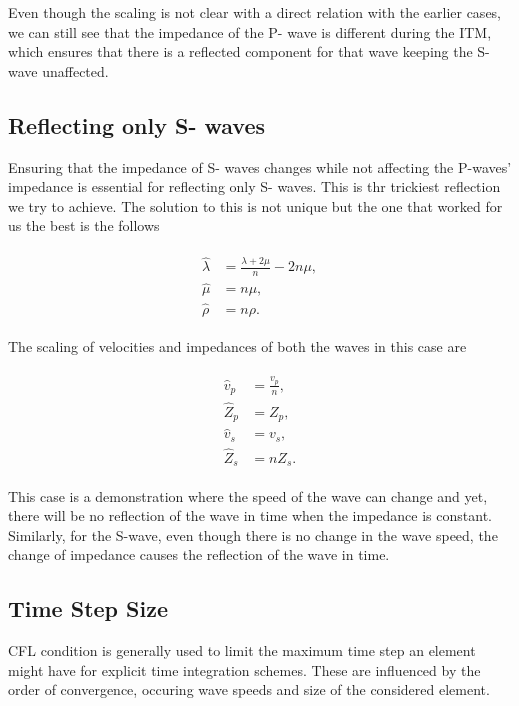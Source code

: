 Even though the scaling is not clear with a direct relation with the earlier cases, we can still see that the impedance of the P- wave is different during the \ac{ITM}, 
which ensures that there is a reflected component for that wave keeping the S-wave unaffected. \\

\subsection{Reflecting only S- waves}

Ensuring that the impedance of S- waves changes while not affecting the P-waves' impedance is essential for reflecting only S- waves. This is thr trickiest
reflection we try to achieve. The solution to this is not unique but the one that worked for us the best is the follows

\begin{align}
    \begin{split}
        \hat{\lambda} &= \frac{\lambda + 2 \mu}{n} -  2n \mu ,\\
        \hat{\mu} &= n \mu ,\\
        \hat{\rho} &= n \rho .
    \end{split}
\end{align}

The scaling of velocities and impedances of both the waves in this case are 

\begin{align}
    \begin{split}
        \hat{v}_p &= \frac{v_p}{n} ,\\
        \hat{Z}_p &= Z_p ,\\
        \hat{v}_s &= v_s ,\\
        \hat{Z}_s &= n Z_s .
    \end{split}
\end{align}

This case is a demonstration where the speed of the wave can change and yet, there will be no reflection of the wave in time when the impedance is constant.
Similarly, for the S-wave, even though there is no change in the wave speed, the change of impedance causes the reflection of the wave in time. \\

\subsection{Time Step Size}
\ac{CFL} condition is generally used to limit the maximum time step an element might have for explicit time integration schemes. These are influenced by the order
of convergence, occuring wave speeds and size of the considered element. \\


